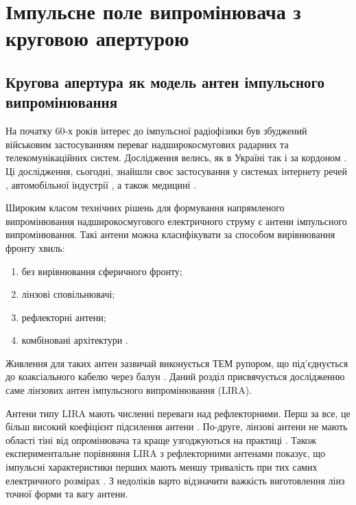 \chapter{Імпульсне поле випромінювача з круговою апертурою}
\label{ch:linear}

\section{Кругова апертура як модель антен імпульсного випромінювання}

На початку 60-х років інтерес до імпульсної радіофізики був збуджений
військовим застосуванням переваг надширокосмугових радарних та 
телекомунікаційних систем. Дослідження велись, як в Україні 
\cite{imp:Dumin1996} так і за кордоном \cite{imp:BaumIN0105}. Ці дослідження, сьогодні,
знайшли своє застосування у системах інтернету речей \cite{imp:Hartmann2015}, 
автомобільної індустрії \cite{imp:Yarovoy2017}, а також медицині 
\cite{imp:Cho2016}.

Широким класом технічних рішень для формування напрямленого випромінювання 
надширокосмугового електричного струму є антени імпульсного випромінювання.
Такі антени можна класифікувати за способом вирівнювання фронту хвиль:

\begin{enumerate}
	\item без вирівнювання сферичного фронту;
	\item лінзові сповільнювачі;
	\item рефлекторні антени;
	\item комбіновані архітектури \cite{imp:BaumSSN0379}.
\end{enumerate}

Живлення для таких антен зазвичай виконується ТЕМ рупором, що під'єднується 
до коаксіального кабелю через балун \cite{imp:BaumSSN0357}. Даний розділ 
присвячується дослідженню саме лінзових антен імпульсного випромінювання (LIRA). 

Антени типу LIRA мають численні переваги над рефлекторними. Перш за все, це
більш високий коефіцієнт підсилення антени \cite{imp:BaumUWBSP1}. По-друге,
лінзові антени не мають області тіні від опромінювача та краще узгоджуються
на практиці \cite{imp:BaumSSN0377}. Також експериментальне порівняння LIRA 
з рефлекторними антенами показує, що імпульсні характеристики перших мають 
меншу тривалість при тих самих електричного розмірах \cite{imp:BaumSSN0377}.
З недоліків варто відзначити важкість виготовлення лінз точної форми та 
вагу антени.

